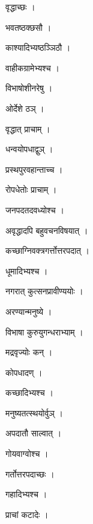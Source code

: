 \documentclass[10pt, openany]{book}
\begin{document}
\noindent वृद्धाच्छः ।

\noindent भवतष्ठक्छसौ ।

\noindent काश्यादिभ्यष्ठञ्ञिठौ ।

\noindent वाहीकग्रामेभ्यश्च ।

\noindent विभाषोशीनरेषु ।

\noindent ओर्देशे ठञ् ।

\noindent वृद्धात् प्राचाम् ।

\noindent धन्वयोपधाद्वुञ् ।

\noindent प्रस्थपुरवहान्ताच्च ।

\noindent रोपधेतोः प्राचाम् ।

\noindent जनपदतदवध्योश्च ।

\noindent अवृद्धादपि बहुवचनविषयात् ।

\noindent कच्छाग्निवक्त्रगर्त्तोत्तरपदात् ।

\noindent धूमादिभ्यश्च ।

\noindent नगरात् कुत्सनप्रावीण्ययोः ।

\noindent अरण्यान्मनुष्ये ।

\noindent विभाषा कुरुयुगन्धराभ्याम् ।

\noindent मद्रवृज्योः कन् ।

\noindent कोपधादण् ।

\noindent कच्छादिभ्यश्च ।

\noindent मनुष्यतत्स्थयोर्वुञ् ।

\noindent अपदातौ साल्वात् ।

\noindent गोयवाग्वोश्च ।

\noindent गर्तोत्तरपदाच्छः ।

\noindent गहादिभ्यश्च ।

\noindent प्राचां कटादेः ।
\end{document}
